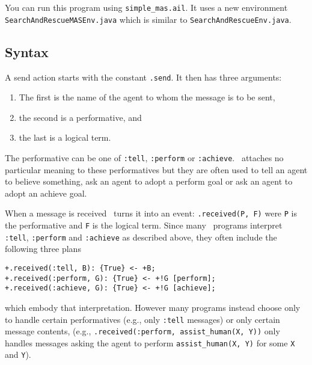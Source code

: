 \begin{sloppypar}
You can run this program using \texttt{simple\_mas.ail}.  It uses a new environment \texttt{SearchAndRescueMASEnv.java} which is similar to \texttt{SearchAndRescueEnv.java}.
\end{sloppypar}

\subsection{Syntax}

A send action starts with the constant \texttt{.send}.  It then has three arguments:
\begin{enumerate}
\item The first is the name of the agent to whom the message is to be sent, 
\item the second is a performative, and 
\item the last is a logical term.  
\end{enumerate}
The performative can be one of \texttt{:tell}, \texttt{:perform} or \texttt{:achieve}.  \gwendolen\ attaches no particular meaning to these performatives but they are often used to tell an agent to believe something, ask an agent to adopt a perform goal or ask an agent to adopt an achieve goal.

\begin{sloppypar}
When a message is received \gwendolen\ turns it into an event: \texttt{.received(P,~F)} were \texttt{P} is the performative and \texttt{F} is the logical term.  Since many \gwendolen\ programs interpret \texttt{:tell}, \texttt{:perform} and \texttt{:achieve} as described above, they often include the following three plans 
\end{sloppypar}
\begin{verbatim}
+.received(:tell, B): {True} <- +B;
+.received(:perform, G): {True} <- +!G [perform];
+.received(:achieve, G): {True} <- +!G [achieve];
\end{verbatim}
which embody that interpretation.  However many programs instead choose only to handle certain performatives (e.g., only \texttt{:tell} messages) or only certain message contents, (e.g., \texttt{.received(:perform, assist\_human(X, Y))} only handles messages asking the agent to perform \texttt{assist\_human(X, Y)} for some \texttt{X} and \texttt{Y}).

